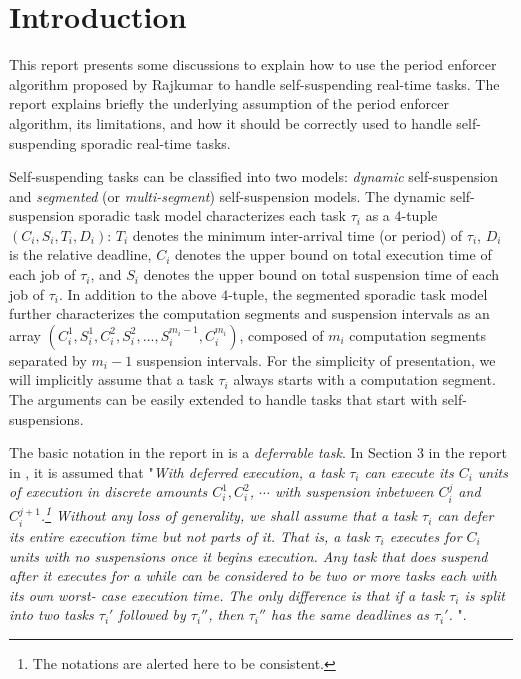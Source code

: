 \section{Introduction} 
This report presents some discussions to explain how to use the period enforcer algorithm proposed by Rajkumar \cite{Raj:suspension1991} to handle self-suspending real-time tasks. The report explains briefly the underlying assumption of the period enforcer algorithm, its limitations, and how it should be correctly used to handle self-suspending sporadic real-time tasks. 

Self-suspending tasks can be classified into two models: \emph{dynamic} self-suspension and \emph{segmented} (or \emph{multi-segment}) self-suspension models. 
The dynamic self-suspension sporadic task model characterizes each
task $\tau_i$ as a $4$-tuple $(C_i,S_i,T_i,D_i)$: $T_i$ denotes the minimum inter-arrival time (or period) of $\tau_i$, $D_i$ is the relative deadline,
$C_i$ denotes the upper bound on total execution time of each job of $\tau_i$,
and $S_i$ denotes the upper bound on total suspension time of each job of $\tau_i$.  In addition to the above $4$-tuple, the segmented sporadic task model further 
characterizes the computation segments and suspension intervals as an array
$(C_{i}^1,S_{i}^1,C_{i}^2,S_{i}^2,...,S_{i}^{m_i-1},C_{i}^{m_i})$, composed of $m_i$ computation segments separated by $m_i-1$ suspension intervals. For the simplicity of presentation, we will implicitly assume that a task $\tau_i$ always starts with a computation segment. The arguments can be easily extended to handle tasks that start with self-suspensions.

The basic notation in the report in \cite{Raj:suspension1991} is a \emph{deferrable task}. In Section 3 in the report in \cite{Raj:suspension1991}, it is assumed that "\emph{With deferred execution, a task $\tau_i$ can execute its $C_i$ units of execution in discrete amounts $C_i^1, C_i^2$, $\cdots$ with suspension inbetween $C_i^j$ and $C_i^{j+1}$.\footnote{The notations are alerted here to be consistent.} Without any loss of generality, we shall assume that a task $\tau_i$ can defer its entire execution time but not parts of it. That is, a task $\tau_i$ executes for $C_i$ units with no suspensions once it begins execution. Any task that does suspend after it executes for a while can be considered to be two or more tasks each with its own worst- case execution time. The only difference is that if a task $\tau_i$ is split into two tasks $\tau_i'$ followed by $\tau_i''$, then $\tau_i''$ has the same deadlines as $\tau_i′$. }". 

